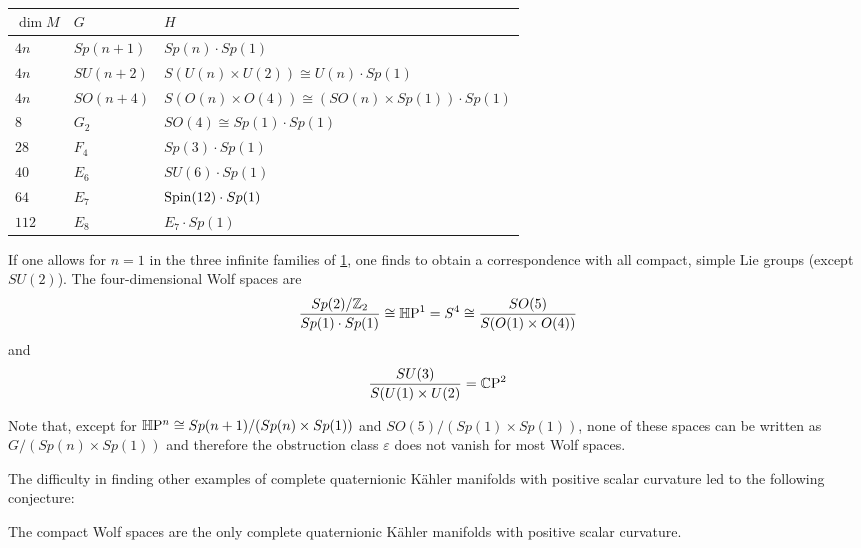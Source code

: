 \begin{table}[ht!]\centering
	\begin{tabular}{lll} \toprule
		$\dim M$	& $G$			
		& $H$							\\ \midrule
		$4n$ 				& $Sp(n+1)$		
		& $Sp(n)\cdot Sp(1)$			\\
		$4n$ 				& $SU(n+2)$		
		& $S(U(n)\times U(2))\cong U(n)\cdot Sp(1)$					\\
		$4n$					& $SO(n+4)$		
		& $S(O(n)\times O(4))\cong (SO(n)\times Sp(1))\cdot Sp(1)$	\\
		$8$					& $G_2$			
		& $SO(4)\cong Sp(1)\cdot Sp(1)$								\\
		$28$					& $F_4$			
		& $Sp(3)\cdot Sp(1)$			\\
		$40$				& $E_6$			
		& $SU(6)\cdot Sp(1) $			\\
		$64$				& $E_7$			
		& $\operatorname{Spin}(12)\cdot Sp(1)$		\\ 
		$112$				& $E_8$			
		& $E_7\cdot Sp(1)$				\\ \bottomrule
	\end{tabular}
	\caption{}\label{tab:Wolfspaces}
\end{table}

If one allows for $n=1$ in the three infinite families of \cref{tab:Wolfspaces}, one finds to obtain a correspondence with all compact, simple Lie groups (except $SU(2)$). The four-dimensional Wolf spaces are
\begin{equation*}
	\frac{Sp(2)/\mathbb{Z}_2}{Sp(1)\cdot Sp(1)}\cong \mathbb{H}\mathrm{P}^1=S^4\cong \frac{SO(5)}{S(O(1)\times O(4))}
\end{equation*}
and
\begin{equation*}
	\frac{SU(3)}{S(U(1)\times U(2)}=\mathbb{C}\mathrm{P}^2
\end{equation*}

Note that, except for $\mathbb{H}\mathrm{P}^n\cong Sp(n+1)/(Sp(n)\times Sp(1))$ and $SO(5)/(Sp(1)\times Sp(1))$, none of these spaces can be written as $G/(Sp(n)\times Sp(1))$ and therefore the obstruction class $\varepsilon$ does not vanish for most Wolf spaces.

The difficulty in finding other examples of complete quaternionic K\"ahler manifolds with positive scalar curvature led to the following conjecture:

\begin{con*}
	The compact Wolf spaces are the only complete quaternionic K\"ahler manifolds with positive scalar curvature.
\end{con*}

